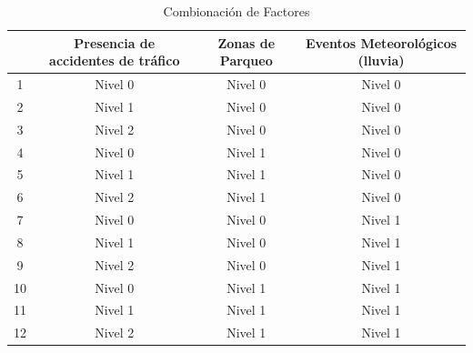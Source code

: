 \begin{table}[tb!hp]
	\begin{tabular}{|c|c|c|c|}
	\hline
		& \multicolumn{1}{m{4.5cm}|}{\centering\textbf{Presencia de accidentes de tr\'{a}fico}} 
		 & \multicolumn{1}{m{4cm}|}{\centering\textbf{Zonas de Parqueo}} & 			\multicolumn{1}{m{4.5cm}|}{\textbf{Eventos Meteorol\'{o}gicos (lluvia)}}\\
	\hline
		1 & Nivel 0 & Nivel 0 & Nivel 0\\
	\hline
		2 & Nivel 1 & Nivel 0 & Nivel 0\\
	\hline
		3 & Nivel 2 & Nivel 0 & Nivel 0\\
	\hline
		4 & Nivel 0 & Nivel 1 & Nivel 0\\
	\hline
		5 & Nivel 1 & Nivel 1 & Nivel 0\\
	\hline
		6 & Nivel 2 & Nivel 1 & Nivel 0\\
	\hline
		7 & Nivel 0 & Nivel 0 & Nivel 1\\
	\hline
		8 & Nivel 1 & Nivel 0 & Nivel 1\\
	\hline
		9 & Nivel 2 & Nivel 0 & Nivel 1\\
	\hline
		10 & Nivel 0 & Nivel 1 & Nivel 1\\
	\hline
		11 & Nivel 1 & Nivel 1 & Nivel 1\\
	\hline
		12 & Nivel 2 & Nivel 1 & Nivel 1\\
	\hline
	\end{tabular}
	\caption{Combionaci\'{o}n de Factores}
	\label{tab:combFact}
\end{table}

